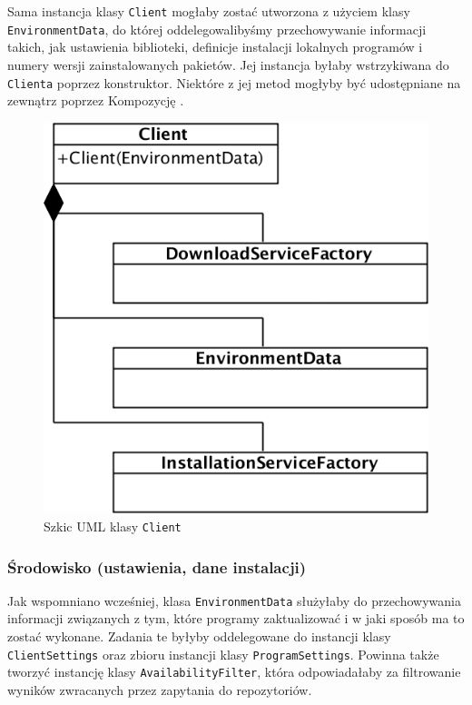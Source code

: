 \documentclass[polish,12pt,titlepage]{article}
\begin{document}
Sama instancja klasy \texttt{Client} mogłaby zostać utworzona z użyciem klasy
\texttt{EnvironmentData}, do której oddelegowalibyśmy przechowywanie
informacji takich, jak ustawienia biblioteki, definicje instalacji lokalnych
programów i numery wersji zainstalowanych pakietów. Jej instancja byłaby
wstrzykiwana do \texttt{Clienta} poprzez konstruktor. Niektóre z jej metod
mogłyby być udostępniane na zewnątrz poprzez Kompozycję \cite{KOMPOZYT}.

\begin{figure}[!ht]
\centering
\includegraphics[bb=0 0 515 523, scale=0.50]{Client.png}
\caption{Szkic UML klasy \texttt{Client}}
\end{figure}

\subsubsection{Środowisko (ustawienia, dane instalacji)}

Jak wspomniano wcześniej, klasa \texttt{EnvironmentData} służyłaby do
przechowywania informacji związanych z tym, które programy zaktualizować i w
jaki sposób ma to zostać wykonane. Zadania te byłyby oddelegowane do instancji
klasy \texttt{ClientSettings} oraz zbioru instancji klasy
\texttt{ProgramSettings}. Powinna także tworzyć instancję klasy
\texttt{AvailabilityFilter}, która odpowiadałaby za filtrowanie wyników
zwracanych przez zapytania do repozytoriów.
\end{document}
